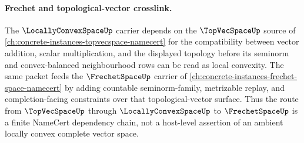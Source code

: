 \paragraph{Frechet and topological-vector crosslink.}
The $\LocallyConvexSpaceUp$ carrier depends on the $\TopVecSpaceUp$ source of \autoref{ch:concrete-instances-topvecspace-namecert} for the compatibility between vector addition, scalar multiplication, and the displayed topology before its seminorm and convex-balanced neighbourhood rows can be read as local convexity. The same packet feeds the $\FrechetSpaceUp$ carrier of \autoref{ch:concrete-instances-frechet-space-namecert} by adding countable seminorm-family, metrizable replay, and completion-facing constraints over that topological-vector surface. Thus the route from $\TopVecSpaceUp$ through $\LocallyConvexSpaceUp$ to $\FrechetSpaceUp$ is a finite NameCert dependency chain, not a host-level assertion of an ambient locally convex complete vector space.
